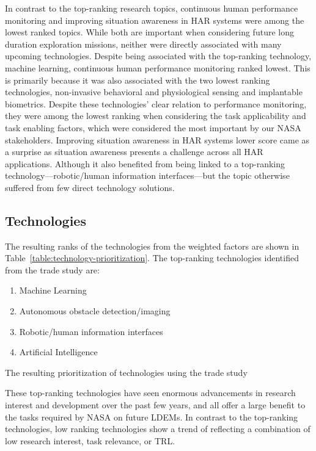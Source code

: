 In contrast to the top-ranking research topics, continuous human performance monitoring and improving situation awareness in HAR systems were among the lowest ranked topics.
While both are important when considering future long duration exploration missions, neither were directly associated with many upcoming technologies.
Despite being associated with the top-ranking technology, machine learning, continuous human performance monitoring ranked lowest.
This is primarily because it was also associated with the two lowest ranking technologies, non-invasive behavioral and physiological sensing and implantable biometrics.
Despite these technologies' clear relation to performance monitoring, they were among the lowest ranking when considering the task applicability and task enabling factors, which were considered the most important by our NASA stakeholders.
Improving situation awareness in HAR systems lower score came as a surprise as situation awareness presents a challenge across all HAR applications.
Although it also benefited from being linked to a top-ranking technology—robotic/human information interfaces—but the topic otherwise suffered from few direct technology solutions.

\subsection{Technologies}
The resulting ranks of the technologies from the weighted factors are shown in Table~\ref{table:technology-prioritization}.
The top-ranking technologies identified from the trade study are:
\begin{enumerate}
    \item Machine Learning
    \item Autonomous obstacle detection/imaging
    \item Robotic/human information interfaces
    \item Artificial Intelligence
\end{enumerate}

\begin{table}[tb]
    \centering
    \caption{The resulting prioritization of technologies using the trade study}
    \label{table:technology-prioritization}
\end{table}

These top-ranking technologies have seen enormous advancements in research interest and development over the past few years, and all offer a large benefit to the tasks required by NASA on future LDEMs.
In contrast to the top-ranking technologies, low ranking technologies show a trend of reflecting a combination of low research interest, task relevance, or TRL.

